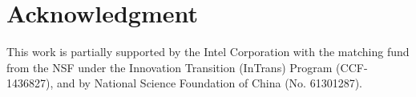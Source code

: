 \documentclass[10pt, conference, compsocconf]{IEEEtran}
\begin{document}
\section*{Acknowledgment}
This work is partially supported by the Intel Corporation with the matching fund from the NSF under the Innovation Transition (InTrans) Program (CCF-1436827), 
and by National Science Foundation of China (No. 61301287).
%
%
%
\newcommand{\BIBdecl}{\setlength{\itemsep}{0.0 em}}

\scriptsize{ 

}
\end{document}
